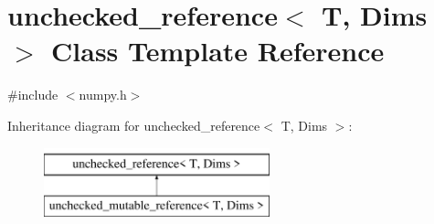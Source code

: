 \hypertarget{classunchecked__reference}{}\section{unchecked\+\_\+reference$<$ T, Dims $>$ Class Template Reference}
\label{classunchecked__reference}


{\ttfamily \#include $<$numpy.\+h$>$}

Inheritance diagram for unchecked\+\_\+reference$<$ T, Dims $>$\+:\begin{figure}[H]
\begin{center}
\leavevmode
\includegraphics[height=2.000000cm]{classunchecked__reference}
\end{center}
\end{figure}
